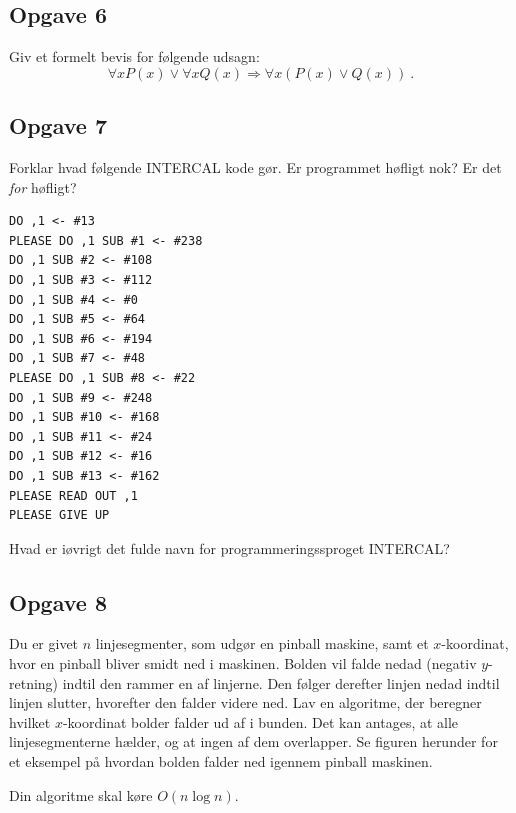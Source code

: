 \subsection{Opgave 6}
Giv et formelt bevis for følgende udsagn:
\[
    \forall x P(x)\lor \forall x Q(x)\Rightarrow \forall x \left(P(x)\lor
        Q(x)\right)\ .
\]


\subsection{Opgave 7}
Forklar hvad følgende INTERCAL kode gør. Er programmet høfligt nok? Er det
\emph{for} høfligt?
\begin{verbatim}
DO ,1 <- #13
PLEASE DO ,1 SUB #1 <- #238
DO ,1 SUB #2 <- #108
DO ,1 SUB #3 <- #112
DO ,1 SUB #4 <- #0
DO ,1 SUB #5 <- #64
DO ,1 SUB #6 <- #194
DO ,1 SUB #7 <- #48
PLEASE DO ,1 SUB #8 <- #22
DO ,1 SUB #9 <- #248
DO ,1 SUB #10 <- #168
DO ,1 SUB #11 <- #24
DO ,1 SUB #12 <- #16
DO ,1 SUB #13 <- #162
PLEASE READ OUT ,1
PLEASE GIVE UP
\end{verbatim}

Hvad er iøvrigt det fulde navn for programmeringssproget INTERCAL?


\subsection{Opgave 8}
Du er givet $n$ linjesegmenter, som udgør en pinball maskine, samt et
$x$-koordinat, hvor en pinball bliver smidt ned i maskinen. Bolden vil falde
nedad (negativ $y$-retning) indtil den rammer en af linjerne. Den følger
derefter linjen nedad indtil linjen slutter, hvorefter den falder videre ned.
Lav en algoritme, der beregner hvilket $x$-koordinat bolder falder ud af i
bunden. Det kan antages, at alle linjesegmenterne hælder, og at ingen af dem
overlapper. Se figuren herunder for et eksempel på hvordan bolden falder ned
igennem pinball maskinen.

Din algoritme skal køre $O(n\log n)$.

